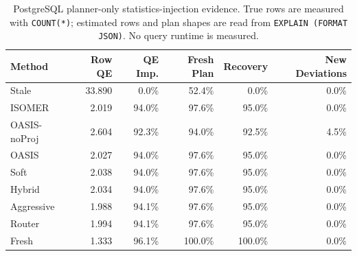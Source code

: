 \begin{table}[t]
  \centering
  \small
  \caption{PostgreSQL planner-only statistics-injection evidence. True rows are measured with \texttt{COUNT(*)}; estimated rows and plan shapes are read from \texttt{EXPLAIN (FORMAT JSON)}. No query runtime is measured.}
  \label{tab:postgres_planner_stats_injection}
  \setlength{\tabcolsep}{4pt}
  \begin{tabular}{lrrrrr}
    \toprule
    Method & Row QE & QE Imp. & Fresh Plan & Recovery & New Deviations \\
    \midrule
    Stale & 33.890 & 0.0\% & 52.4\% & 0.0\% & 0.0\% \\
    ISOMER & 2.019 & 94.0\% & 97.6\% & 95.0\% & 0.0\% \\
    OASIS-noProj & 2.604 & 92.3\% & 94.0\% & 92.5\% & 4.5\% \\
    OASIS & 2.027 & 94.0\% & 97.6\% & 95.0\% & 0.0\% \\
    Soft & 2.038 & 94.0\% & 97.6\% & 95.0\% & 0.0\% \\
    Hybrid & 2.034 & 94.0\% & 97.6\% & 95.0\% & 0.0\% \\
    Aggressive & 1.988 & 94.1\% & 97.6\% & 95.0\% & 0.0\% \\
    Router & 1.994 & 94.1\% & 97.6\% & 95.0\% & 0.0\% \\
    Fresh & 1.333 & 96.1\% & 100.0\% & 100.0\% & 0.0\% \\
    \bottomrule
  \end{tabular}
\end{table}
